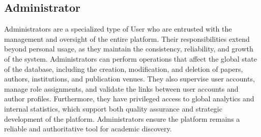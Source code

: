 \subsection{Administrator}
Administrators are a specialized type of User who are entrusted with the management and oversight of the entire platform. Their responsibilities extend beyond personal usage, as they maintain the consistency, reliability, and growth of the system. Administrators can perform operations that affect the global state of the database, including the creation, modification, and deletion of papers, authors, institutions, and publication venues. They also supervise user accounts, manage role assignments, and validate the links between user accounts and author profiles. Furthermore, they have privileged access to global analytics and internal statistics, which support both quality assurance and strategic development of the platform. Administrators ensure the platform remains a reliable and authoritative tool for academic discovery.

